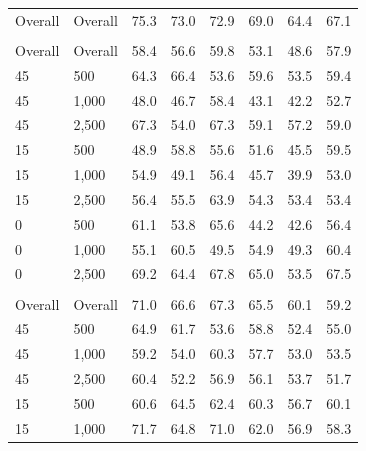 \documentclass[twoside,11pt]{article}\usepackage[]{graphicx}\usepackage[]{xcolor}
\newenvironment{knitrout}{}{} %
\begin{document}
\begin{knitrout}
\begin{landscape}
\begin{longtable}[t]{llcccccc}
\endfoot
\bottomrule
\endlastfoot
Overall & Overall & 75.3 & 73.0 & 72.9 & 69.0 & 64.4 & 67.1\\
\addlinespace[0.3em]
\multicolumn{8}{l}{\textit{\textbf{Interactions}}}\\
\hline
\hspace{1em}Overall & Overall & 58.4 & 56.6 & 59.8 & 53.1 & 48.6 & 57.9\\
\hspace{1em}45 & 500 & 64.3 & 66.4 & 53.6 & 59.6 & 53.5 & 59.4\\
\hspace{1em}45 & 1,000 & 48.0 & 46.7 & 58.4 & 43.1 & 42.2 & 52.7\\
\hspace{1em}45 & 2,500 & 67.3 & 54.0 & 67.3 & 59.1 & 57.2 & 59.0\\
\hspace{1em}15 & 500 & 48.9 & 58.8 & 55.6 & 51.6 & 45.5 & 59.5\\
\hspace{1em}15 & 1,000 & 54.9 & 49.1 & 56.4 & 45.7 & 39.9 & 53.0\\
\hspace{1em}15 & 2,500 & 56.4 & 55.5 & 63.9 & 54.3 & 53.4 & 53.4\\
\hspace{1em}0 & 500 & 61.1 & 53.8 & 65.6 & 44.2 & 42.6 & 56.4\\
\hspace{1em}0 & 1,000 & 55.1 & 60.5 & 49.5 & 54.9 & 49.3 & 60.4\\
\hspace{1em}0 & 2,500 & 69.2 & 64.4 & 67.8 & 65.0 & 53.5 & 67.5\\
\addlinespace[0.3em]
\multicolumn{8}{l}{\textit{\textbf{Non-linear effects}}}\\
\hline
\hspace{1em}Overall & Overall & 71.0 & 66.6 & 67.3 & 65.5 & 60.1 & 59.2\\
\hspace{1em}45 & 500 & 64.9 & 61.7 & 53.6 & 58.8 & 52.4 & 55.0\\
\hspace{1em}45 & 1,000 & 59.2 & 54.0 & 60.3 & 57.7 & 53.0 & 53.5\\
\hspace{1em}45 & 2,500 & 60.4 & 52.2 & 56.9 & 56.1 & 53.7 & 51.7\\
\hspace{1em}15 & 500 & 60.6 & 64.5 & 62.4 & 60.3 & 56.7 & 60.1\\
\hspace{1em}15 & 1,000 & 71.7 & 64.8 & 71.0 & 62.0 & 56.9 & 58.3\\

\end{longtable}
\end{landscape}
\end{knitrout}
\end{document}

